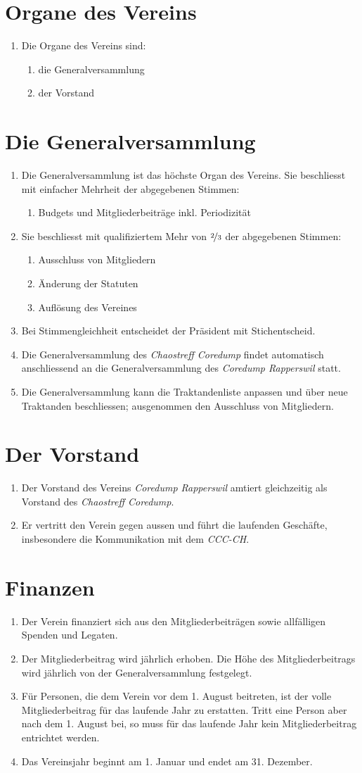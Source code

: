 \documentclass[10pt,a4paper,parskip,fleqn]{scrartcl}
\newcommand{\ol}{\begin{enumerate}[itemsep=-0.2em,topsep=-0.2em]}
\newcommand{\lo}{\end{enumerate}}
\newcommand{\li}{\item}
\newcommand{\name}{Chaostreff Coredump\xspace}
\newcommand{\iname}{\textit{\name}\xspace}
\newcommand{\parent}{Coredump Rapperswil\xspace}
\newcommand{\iparent}{\textit{\parent}\xspace}
\newcommand{\cccch}{CCC-CH\xspace}
\newcommand{\icccch}{\textit{\cccch}\xspace}
\begin{document}
\section{Organe des Vereins}

\ol
	\li Die Organe des Vereins sind:
		\ol
			\li die Generalversammlung
			\li der Vorstand
		\lo
\lo


\section{Die Generalversammlung}

\ol
	\li Die Generalversammlung ist das höchste Organ des Vereins. Sie beschliesst
	mit einfacher Mehrheit der abgegebenen Stimmen:
		\ol
			\li Budgets und Mitgliederbeiträge inkl. Periodizität
		\lo
	\li Sie beschliesst mit qualifiziertem Mehr von $\nicefrac{2}{3}$ der
	abgegebenen Stimmen:
		\ol
			\li Ausschluss von Mitgliedern
			\li Änderung der Statuten
			\li Auflösung des Vereines
		\lo
	\li Bei Stimmengleichheit entscheidet der Präsident mit Stichentscheid.
	\li Die Generalversammlung des \iname findet automatisch anschliessend an die
	Generalversammlung des \iparent statt.
	\li Die Generalversammlung kann die Traktandenliste anpassen und über neue
	Traktanden beschliessen; ausgenommen den Ausschluss von Mitgliedern.
\lo


\section{Der Vorstand}

\ol
	\li Der Vorstand des Vereins \iparent amtiert gleichzeitig als Vorstand des
	\iname.
	\li Er vertritt den Verein gegen aussen und führt die laufenden Geschäfte,
	insbesondere die Kommunikation mit dem \icccch.
\lo


\section{Finanzen}

\ol
	\li Der Verein finanziert sich aus den Mitgliederbeiträgen sowie allfälligen
	Spenden und Legaten.
	\li Der Mitgliederbeitrag wird jährlich erhoben. Die Höhe des
	Mitgliederbeitrags wird jährlich von der Generalversammlung festgelegt.
	\li Für Personen, die dem Verein vor dem 1. August beitreten, ist der volle
	Mitgliederbeitrag für das laufende Jahr zu erstatten. Tritt eine Person aber
	nach dem 1. August bei, so muss für das laufende Jahr kein Mitgliederbeitrag
	entrichtet werden.
	\li Das Vereinsjahr beginnt am 1. Januar und endet am 31. Dezember.
\lo
\end{document}
